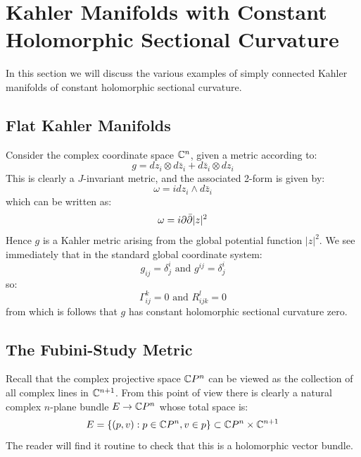 \section{Kahler Manifolds with Constant Holomorphic Sectional Curvature}

In this section we will discuss the various examples of simply connected Kahler manifolds of constant holomorphic sectional curvature.

\subsection{Flat Kahler Manifolds}

Consider the complex coordinate space $\mathbb{C}^n$, given a metric according to:
%
$$ g = d z_i \otimes d \bar{z}_i + d \bar{z}_i \otimes d z_i $$
%
This is clearly a $J$-invariant metric, and the associated 2-form is given by:
%
$$ \omega = i d z_i \wedge d \bar{z}_i $$
%
which can be written as:
%
$$ \omega = i \partial \bar{\partial} |z|^2 $$
%
Hence $g$ is a Kahler metric arising from the global potential function $|z|^2$.  We see immediately that in the standard global coordinate system:
%
$$ g_{ij} = \delta^i_j \text{ and } g^{ij} = \delta^i_j $$
%
so:
%
$$ \Gamma_{ij}^k = 0 \text{ and } R_{ijk}^l = 0 $$
%
from which is follows that $g$ has constant holomorphic sectional curvature zero.


\subsection{The Fubini-Study Metric}

Recall that the complex projective space $\mathbb{C}P^n$ can be viewed as the collection of all complex lines in $\mathbb{C}^{n+1}$.  From this point of view there is clearly a natural complex $n$-plane bundle $E \rightarrow \mathbb{C}P^n$ whose total space is:
%
$$ E = \{ (p,v) : p \in \mathbb{C}P^n, v \in p \} \subset \mathbb{C}P^n \times \mathbb{C}^{n+1} $$
%
The reader will find it routine to check that this is a holomorphic vector bundle.  


